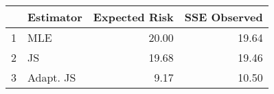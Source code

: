 \begin{table}[ht]
\centering
\begin{tabular}{rlrr}
  \hline
 & Estimator & Expected Risk & SSE Observed \\ 
  \hline
1 & MLE & 20.00 & 19.64 \\ 
  2 & JS & 19.68 & 19.46 \\ 
  3 & Adapt. JS & 9.17 & 10.50 \\ 
   \hline
\end{tabular}
\end{table}
